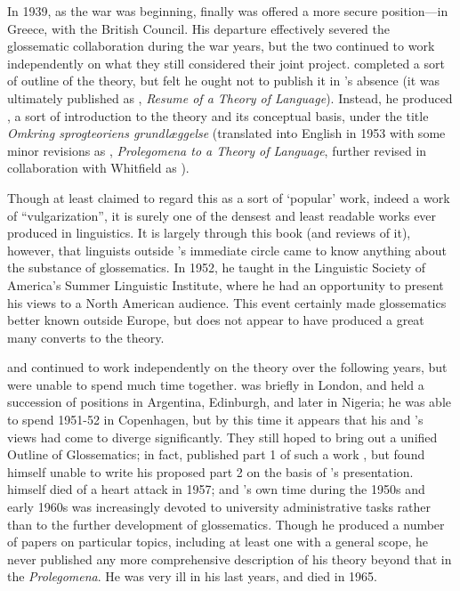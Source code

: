 In 1939, as the war was beginning, {\Uldall} finally was offered a more
secure position—in Greece, with the British Council. His departure
effectively severed the glossematic collaboration during the war
years, but the two continued to work independently on what they still
considered their joint project. {\Hjelmslev} completed a sort of outline
of the theory, but felt he ought not to publish it in {\Uldall}'s absence
(it was ultimately published as \citet{hjelmslev75:resume},
\textsl{Resume of a Theory of Language}). Instead, he produced
\citet{hjelmslev43:prolegomena}, a sort of introduction to the theory
and its conceptual basis, under the title \textsl{Omkring
  sprogteoriens grundlæggelse} (translated into {English} in 1953 with
some minor revisions as \citet{hjelmslev53:osg.whitfield},
\textsl{Prolegomena to a Theory of Language}, further revised in
collaboration with Whitfield as \citet{hjelmslev61:prolegomena}).

Though {\Hjelmslev} at least claimed to regard this as a sort of
`popular' work, indeed a work of ``vulgarization'', it is surely one of
the densest and least readable works ever produced in linguistics. It
is largely through this book (and reviews of it), however, that
linguists outside {\Hjelmslev}'s immediate circle came to know anything
about the substance of glossematics. In 1952, he taught in the
{Linguistic Society of America}'s Summer {Linguistic Institute}, where he
had an opportunity to present his views to a North American
audience. This event certainly made glossematics better known outside
Europe, but does not appear to have produced a great many converts to
the theory.

{\Hjelmslev} and {\Uldall} continued to work independently on the theory
over the following years, but were unable to spend much time
together. {\Uldall} was briefly in London, and held a succession of
positions in Argentina, Edinburgh, and later in Nigeria; he was able
to spend 1951-52 in Copenhagen, but by this time it appears that his
and {\Hjelmslev}'s views had come to diverge significantly. They still
hoped to bring out a unified Outline of Glossematics; in fact, {\Uldall}
published part 1 of such a work \citep{uldall57:outline}, but
{\Hjelmslev} found himself unable to write his proposed part 2 on the
basis of {\Uldall}'s presentation. {\Uldall} himself died of a heart attack
in 1957; and {\Hjelmslev}'s own time during the 1950s and early 1960s was
increasingly devoted to university administrative tasks rather than to
the further development of glossematics. Though he produced a number
of papers on particular topics, including at least one
\citep{hjelmslev54:stratification} with a general scope, he never
published any more comprehensive description of his theory beyond that
in the \textsl{Prolegomena}. He was very ill in his last years, and
died in 1965.

